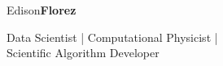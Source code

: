 \begin{center}
    {\fontsize{50}{40}\selectfont Edison\bf Florez}

    \Large{
        Data Scientist | Computational Physicist | \\
        Scientific Algorithm Developer
    }
\end{center}
